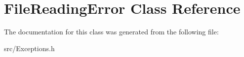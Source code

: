 \hypertarget{class_file_reading_error}{}\section{File\+Reading\+Error Class Reference}
\label{class_file_reading_error}


The documentation for this class was generated from the following file\+:\begin{DoxyCompactItemize}
\item 
src/Exceptions.\+h\end{DoxyCompactItemize}
